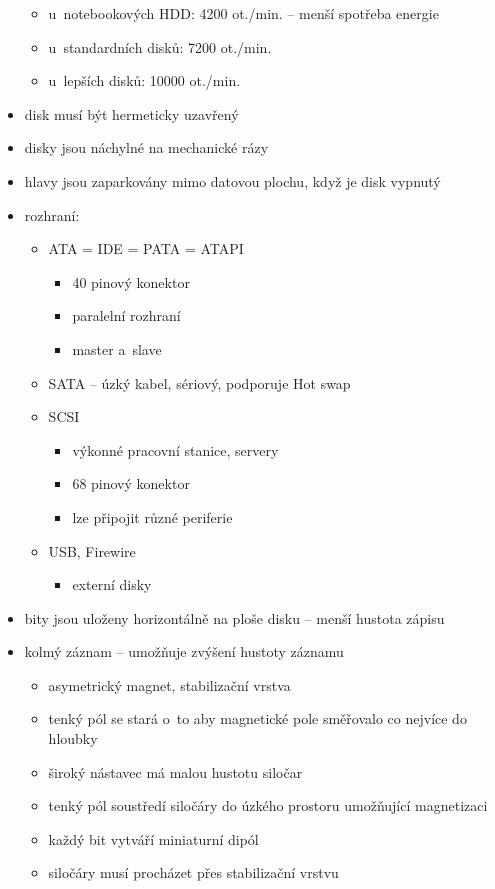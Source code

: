 \documentclass[a4paper,12pt]{article}
\providecommand{\tightlist}{%
\setlength{\itemsep}{0pt}\setlength{\parskip}{0pt}}
\begin{document}
\begin{itemize}
  \begin{itemize}
  \tightlist
  \item u~notebookových HDD: 4200 ot./min. -- menší spotřeba energie
  \item u~standardních disků: 7200 ot./min.
  \item u~lepších disků: 10000 ot./min.
  \end{itemize}
\item disk musí být hermeticky uzavřený
\item disky jsou náchylné na mechanické rázy
\item hlavy jsou zaparkovány mimo datovou plochu, když je disk vypnutý
\item rozhraní:

  \begin{itemize}
    \tightlist
  \item ATA = IDE = PATA = ATAPI

    \begin{itemize}
    \tightlist
    \item 40 pinový konektor
    \item paralelní rozhraní
    \item master a~slave
    \end{itemize}
  \item SATA -- úzký kabel, sériový, podporuje Hot swap
  \item SCSI

    \begin{itemize}
    \tightlist
    \item výkonné pracovní stanice, servery
    \item 68 pinový konektor
    \item lze připojit různé periferie
    \end{itemize}
  \item USB, Firewire

    \begin{itemize}
    \tightlist
    \item externí disky
    \end{itemize}
  \end{itemize}
\item bity jsou uloženy horizontálně na ploše disku -- menší hustota zápisu
\item kolmý záznam -- umožňuje zvýšení hustoty záznamu

  \begin{itemize}
  \tightlist
  \item asymetrický magnet, stabilizační vrstva
  \item tenký pól se stará o~to aby magnetické pole směřovalo co nejvíce do
    hloubky
  \item široký nástavec má malou hustotu siločar
  \item tenký pól soustředí siločáry do úzkého prostoru umožňující
    magnetizaci
  \item každý bit vytváří miniaturní dipól
  \item siločáry musí procházet přes stabilizační vrstvu
  \end{itemize}
\end{itemize}
\end{document}
